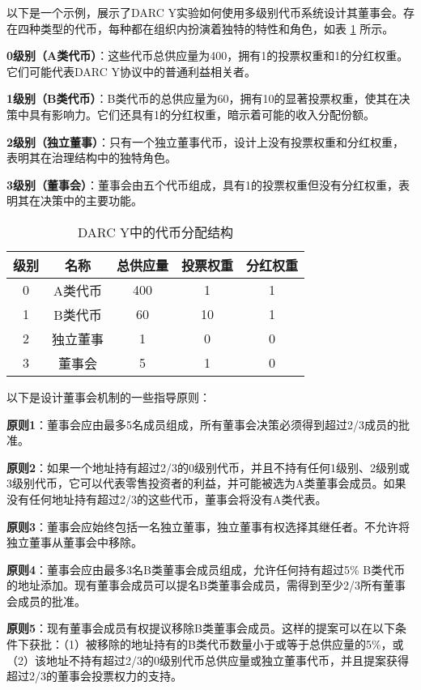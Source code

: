 \documentclass[main.tex]{subfiles}
\begin{document}
以下是一个示例，展示了DARC Y实验如何使用多级别代币系统设计其董事会。存在四种类型的代币，每种都在组织内扮演着独特的特性和角色，如表 \ref{table:3} 所示。

\textbf{0级别（A类代币）}：这些代币总供应量为400，拥有1的投票权重和1的分红权重。它们可能代表DARC Y协议中的普通利益相关者。

\textbf{1级别（B类代币）}：B类代币的总供应量为60，拥有10的显著投票权重，使其在决策中具有影响力。它们还具有1的分红权重，暗示着可能的收入分配份额。

\textbf{2级别（独立董事）}：只有一个独立董事代币，设计上没有投票权重和分红权重，表明其在治理结构中的独特角色。

\textbf{3级别（董事会）}：董事会由五个代币组成，具有1的投票权重但没有分红权重，表明其在决策中的主要功能。

\begin{table}[h!]
\centering
\begin{tabular}{||c c c c c||} 
 \hline
 级别 & 名称 & 总供应量 & 投票权重 & 分红权重 \\ [0.5ex] 
 \hline\hline

 0 & A类代币 & 400 & 1 & 1 \\
 1 & B类代币 & 60 & 10 & 1 \\
 2 & 独立董事 & 1 & 0 & 0 \\
 3 & 董事会 & 5 & 1 & 0 \\
 \hline
\end{tabular}
\caption{DARC Y中的代币分配结构}
\label{table:3}
\end{table}

以下是设计董事会机制的一些指导原则：

\textbf{原则1}：董事会应由最多5名成员组成，所有董事会决策必须得到超过2/3成员的批准。

\textbf{原则2}：如果一个地址持有超过2/3的0级别代币，并且不持有任何1级别、2级别或3级别代币，它可以代表零售投资者的利益，并可能被选为A类董事会成员。如果没有任何地址持有超过2/3的这些代币，董事会将没有A类代表。

\textbf{原则3}：董事会应始终包括一名独立董事，独立董事有权选择其继任者。不允许将独立董事从董事会中移除。

\textbf{原则4}：董事会应由最多3名B类董事会成员组成，允许任何持有超过5\% B类代币的地址添加。现有董事会成员可以提名B类董事会成员，需得到至少2/3所有董事会成员的批准。

\textbf{原则5}：现有董事会成员有权提议移除B类董事会成员。这样的提案可以在以下条件下获批：（1）被移除的地址持有的B类代币数量小于或等于总供应量的5\%，或（2）该地址不持有超过2/3的0级别代币总供应量或独立董事代币，并且提案获得超过2/3的董事会投票权力的支持。
\end{document}
